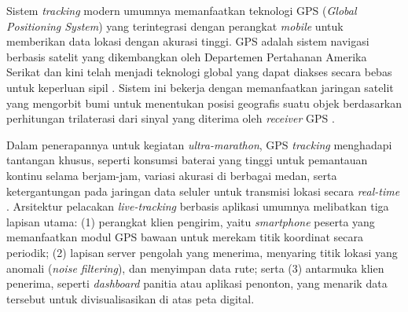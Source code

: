 Sistem \textit{tracking} modern umumnya memanfaatkan teknologi GPS (\textit{Global Positioning System}) yang terintegrasi dengan perangkat \textit{mobile} untuk memberikan data lokasi dengan akurasi tinggi. GPS adalah sistem navigasi berbasis satelit yang dikembangkan oleh Departemen Pertahanan Amerika Serikat dan kini telah menjadi teknologi global yang dapat diakses secara bebas untuk keperluan sipil \cite{el2002introduction}. Sistem ini bekerja dengan memanfaatkan jaringan satelit yang mengorbit bumi untuk menentukan posisi geografis suatu objek berdasarkan perhitungan trilaterasi dari sinyal yang diterima oleh \textit{receiver} GPS \cite{kaplan2017understanding}.

Dalam penerapannya untuk kegiatan \textit{ultra-marathon}, GPS \textit{tracking} menghadapi tantangan khusus, seperti konsumsi baterai yang tinggi untuk pemantauan kontinu selama berjam-jam, variasi akurasi di berbagai medan, serta ketergantungan pada jaringan data seluler untuk transmisi lokasi secara \textit{real-time} \cite{gilgen2019rr}. Arsitektur pelacakan \textit{live-tracking} berbasis aplikasi umumnya melibatkan tiga lapisan utama: (1) perangkat klien pengirim, yaitu \textit{smartphone} peserta yang memanfaatkan modul GPS bawaan untuk merekam titik koordinat secara periodik; (2) lapisan server pengolah yang menerima, menyaring titik lokasi yang anomali (\textit{noise filtering}), dan menyimpan data rute; serta (3) antarmuka klien penerima, seperti \textit{dashboard} panitia atau aplikasi penonton, yang menarik data tersebut untuk divisualisasikan di atas peta digital. 

